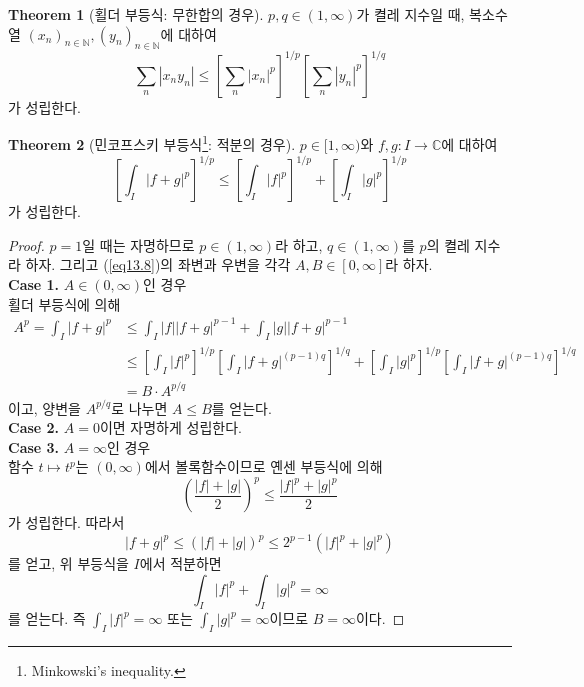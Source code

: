 \documentclass[11pt]{book}
\numberwithin{equation}{chapter}
\def\NN{\mathbb{N}}
\def\CC{\mathbb{C}}
\newcommand{\abs}[1]{\left\vert#1\right\vert}
\newcommand{\paren}[1]{\left(#1\right)}
\newcommand{\sqbracket}[1]{\left[#1\right]}
\theoremstyle{definition}
\newtheorem{thm}{Theorem}[section]
\begin{document}
\begin{thm}[횔더 부등식: 무한합의 경우]
    \(p, q \in (1, \infty)\)가 켤레 지수일 때, 복소수열 \((x_n)_{n \in \NN}, (y_n)_{n \in \NN}\)에 대하여
    \[
    \sum_n \abs{x_n y_n} \le \sqbracket{\sum_n \abs{x_n}^p}^{1/p}\sqbracket{\sum_n \abs{y_n}^p}^{1/q}  
    \]
    가 성립한다.
\end{thm}

\begin{thm}[민코프스키 부등식\footnote{Minkowski's inequality.}: 적분의 경우]
    \(p \in [1, \infty)\)와 \(f, g : I \to \CC\)에 대하여
    \begin{equation} \label{eq13.8}
        \sqbracket{\int_I \abs{f+g}^p}^{1/p} \le \sqbracket{\int_I \abs{f}^p}^{1/p} + \sqbracket{\int_I \abs{g}^p}^{1/p}
    \end{equation}
    가 성립한다.
\end{thm}
\begin{proof}
    \(p = 1\)일 때는 자명하므로 \(p \in (1, \infty)\)라 하고, \(q \in (1, \infty)\)를 \(p\)의 켤레 지수라 하자. 그리고 (\ref{eq13.8})의 좌변과 우변을 각각 \(A, B \in [0, \infty]\)라 하자.\\
    \textbf{Case 1.} \(A \in (0, \infty)\)인 경우\\
    횔더 부등식에 의해
    \begin{align*}
        A^p = \int_I \abs{f+g}^p &\le \int_I \abs{f}\abs{f+g}^{p-1} + \int_I \abs{g}\abs{f+g}^{p-1}\\
        &\le \sqbracket{\int_I \abs{f}^p}^{1/p} \sqbracket{\int_I \abs{f+g}^{(p-1)q}}^{1/q} + \sqbracket{\int_I \abs{g}^p}^{1/p} \sqbracket{\int_I \abs{f+g}^{(p-1)q}}^{1/q}\\
        &= B \cdot A^{p/q}
    \end{align*}
    이고, 양변을 \(A^{p/q}\)로 나누면 \(A \le B\)를 얻는다.\\
    \textbf{Case 2.} \(A = 0\)이면 자명하게 성립한다.\\
    \textbf{Case 3.} \(A = \infty\)인 경우\\
    함수 \(t \mapsto t^p\)는 \((0, \infty)\)에서 볼록함수이므로 옌센 부등식에 의해
    \[
    \paren{\frac{\abs{f}+\abs{g}}{2}}^p \le \frac{\abs{f}^p + \abs{g}^p}{2}
    \]
    가 성립한다. 따라서
    \[
    \abs{f+g}^p \le (\abs{f} + \abs{g})^p \le 2^{p-1}(\abs{f}^p + \abs{g}^p)
    \]
    를 얻고, 위 부등식을 \(I\)에서 적분하면
    \[
        \int_I \abs{f}^p + \int_I \abs{g}^p = \infty
    \]
    를 얻는다. 즉 \(\int_I \abs{f}^p = \infty\) 또는 \(\int_I \abs{g}^p = \infty\)이므로 \(B = \infty\)이다.
\end{proof}
\end{document}
